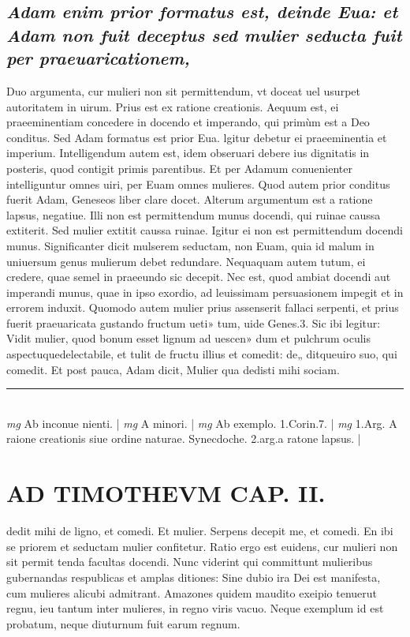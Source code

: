 \documentclass{article}
\begin{document}
\begin{pages}
\subsection*{\textit{Adam enim prior formatus est, deinde Eua: et Adam non fuit deceptus sed mulier seducta fuit per praeuaricationem, }}\pstart Duo argumenta, cur mulieri non sit permittendum, vt doceat uel usurpet autoritatem in uirum. Prius est ex ratione creationis. Aequum est, ei praeeminentiam concedere in docendo et imperando, qui primùm est a Deo conditus. Sed Adam formatus est prior Eua. lgitur debetur ei praeeminentia et imperium. Intelligendum autem est, idem obseruari debere ius dignitatis in posteris, quod contigit primis parentibus. Et per Adamum conuenienter intelliguntur omnes uiri, per Euam omnes mulieres. Quod autem prior conditus fuerit Adam, Geneseos liber clare docet. Alterum argumentum est a ratione lapsus, negatiue. Illi non est permittendum munus docendi, qui ruinae caussa extiterit. Sed mulier extitit caussa ruinae. Igitur ei non est permittendum docendi munus. Significanter dicit mulserem seductam, non Euam, quia id malum in uniuersum genus mulierum debet redundare. Nequaquam autem tutum, ei credere, quae semel in praeeundo sic decepit. Nec est, quod ambiat docendi aut imperandi munus, quae in ipso exordio, ad leuissimam persuasionem impegit et in errorem induxit. Quomodo autem mulier prius assenserit fallaci serpenti, et prius fuerit praeuaricata gustando fructum ueti» tum, uide Genes.3. Sic ibi legitur: Vidit mulier, quod bonum esset lignum ad uescen» dum et pulchrum oculis aspectuquedelectabile, et tulit de fructu illius et comedit: de„ ditqueuiro suo, qui comedit. Et post pauca, Adam dicit, Mulier qua dedisti mihi sociam.  \pend
\vspace{0.5cm}\noindent
\vspace{0.2cm}\rule{1cm}{0.2pt}\\ 
\hspace{0.2cm}\textit{mg}
\footnotesize Ab inconue nienti. 
\normalsize| 
\hspace{0.2cm}\textit{mg}
\footnotesize A minori. 
\normalsize| 
\hspace{0.2cm}\textit{mg}
\footnotesize Ab exemplo. 1.Corin.7. 
\normalsize| 
\hspace{0.2cm}\textit{mg}
\footnotesize 1.Arg. A raione creationis siue ordine naturae. Synecdoche. 2.arg.a ratone lapsus. 
\normalsize| 
\section*{AD TIMOTHEVM CAP. II. }
\marginpar{[ p.73 ]}\pstart dedit mihi de ligno, et comedi. Et mulier. Serpens decepit me, et comedi. En ibi se priorem et seductam mulier confitetur. Ratio ergo est euidens, cur mulieri non sit permit tenda facultas docendi. Nunc viderint qui committunt mulieribus gubernandas respublicas et amplas ditiones: Sine dubio ira Dei est manifesta, cum mulieres alicubi admitrant. Amazones quidem maudito exeipio tenuerut regnu, ieu tantum inter mulieres, in regno viris vacuo. Neque  exemplum id est probatum, neque  diuturnum fuit earum regnum.  \pend
{}
{}

\end{pages}
\end{document}
